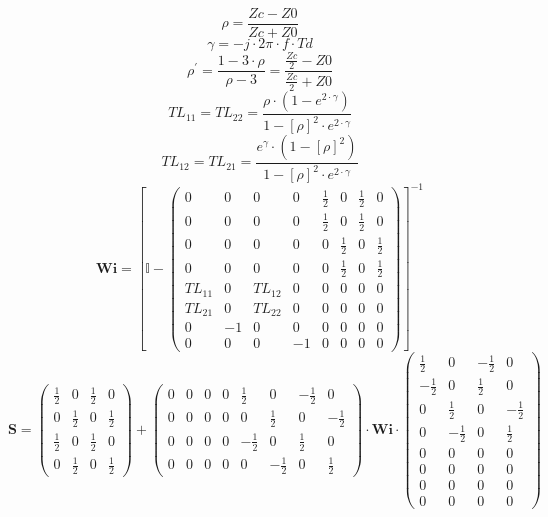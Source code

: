 \[ \rho =  \frac{ Zc-Z0 }{ Zc + Z0 } \]
\[ \gamma =  -j \cdot 2 \pi \cdot f \cdot Td \]
\[ \rho^\prime = \frac{1-3\cdot \rho }{\rho - 3} =  \frac{ \frac{ Zc
}{2} - Z0  }{ \frac{ Zc }{2} + Z0 } \]
\[ TL_{11}=TL_{22} =  \frac{ \rho \cdot \left( 1 - e^{2 \cdot \gamma }
\right) }{ 1 - \left[ \rho \right]^2 \cdot e^{2 \cdot \gamma }  } \]
\[ TL_{12}=TL_{21} =  \frac{ e^{\gamma} \cdot \left( 1 - \left[ \rho
\right] ^2 \right) }{ 1 - \left[ \rho \right]^2 \cdot e^{2 \cdot
\gamma }  }  \]
\[ \mathbf{Wi} =  \left[ \mathbb{I}  - \left(\begin{smallmatrix} 0 & 0
& 0 & 0 &  \frac{ 1 }{ 2 }  & 0 &  \frac{ 1 }{2}  & 0 \\ 0 & 0 & 0 & 0
&  \frac{ 1 }{2}  & 0 &  \frac{ 1 }{ 2 }  & 0 \\ 0 & 0 & 0 & 0 & 0 &
\frac{ 1 }{ 2 }  & 0 &  \frac{ 1 }{2}  \\ 0 & 0 & 0 & 0 & 0 &  \frac{
1 }{2}  & 0 &  \frac{ 1 }{ 2 }  \\ TL_{11} & 0 & TL_{12} & 0 & 0 & 0 &
0 & 0 \\ TL_{21} & 0 & TL_{22} & 0 & 0 & 0 & 0 & 0 \\ 0 & -1 & 0 & 0 &
0 & 0 & 0 & 0 \\ 0 & 0 & 0 & -1 & 0 & 0 & 0 & 0
\end{smallmatrix}\right) \right]^{-1}  \]
\[ \mathbf{S} = \left(\begin{smallmatrix}  \frac{ 1 }{2}  & 0 &
\frac{ 1 }{ 2 }  & 0 \\ 0 &  \frac{ 1 }{2}  & 0 &  \frac{ 1 }{ 2 }  \\
\frac{ 1 }{ 2 }  & 0 &  \frac{ 1 }{2}  & 0 \\ 0 &  \frac{ 1 }{ 2 }  &
0 &  \frac{ 1 }{2}  \end{smallmatrix}\right) +
\left(\begin{smallmatrix} 0 & 0 & 0 & 0 &  \frac{ 1 }{ 2 }  & 0 &
-\frac{ 1 }{ 2 }  & 0 \\ 0 & 0 & 0 & 0 & 0 &  \frac{ 1 }{ 2 }  & 0 &
-\frac{ 1 }{ 2 }  \\ 0 & 0 & 0 & 0 &  -\frac{ 1 }{ 2 }  & 0 &  \frac{
1 }{ 2 }  & 0 \\ 0 & 0 & 0 & 0 & 0 &  -\frac{ 1 }{ 2 }  & 0 &  \frac{
1 }{ 2 }  \end{smallmatrix}\right) \cdot \mathbf{Wi}
\cdot\left(\begin{smallmatrix}  \frac{ 1 }{ 2 }  & 0 &  -\frac{ 1 }{ 2
}  & 0 \\  -\frac{ 1 }{ 2 }  & 0 &  \frac{ 1 }{ 2 }  & 0 \\ 0 &
\frac{ 1 }{ 2 }  & 0 &  -\frac{ 1 }{ 2 }  \\ 0 &  -\frac{ 1 }{ 2 }  &
0 &  \frac{ 1 }{ 2 }  \\ 0 & 0 & 0 & 0 \\ 0 & 0 & 0 & 0 \\ 0 & 0 & 0 &
0 \\ 0 & 0 & 0 & 0 \end{smallmatrix}\right) \]
